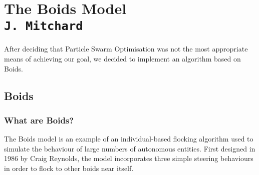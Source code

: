 \pagestyle{empty}

\section{The Boids Model\\{\small\tt J.~Mitchard}}
After deciding that Particle Swarm Optimisation was not the most appropriate means of achieving our goal, we decided to implement an algorithm based on Boids.

\subsection{Boids}
\subsubsection{What are Boids?}
The Boids model is an example of an individual-based flocking algorithm used to simulate the behaviour of large numbers of autonomous entities. First designed in 1986 by Craig Reynolds, the model incorporates three simple steering behaviours in order to flock to other boids near itself.

